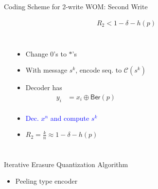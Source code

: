 \documentclass[10pt]{beamer}
\def\WOM_path{../compound-codes/WOM/slides/Figures}
\begin{document}
\begin{frame}{Coding Scheme for 2-write WOM: Second Write}
  \vspace{-2cm}
  \begin{center}
    \begin{align*}
      R_2 < 1 - \delta - h(p)
    \end{align*}
  \end{center}
  \vspace{-0.5cm}
  \begin{columns}
    \begin{center}
      \scalebox{0.5}{}
    \end{center}

    \begin{itemize}
    \item<1-> \alert{Change $0$'s to $*$'s}
    \item<1-> With message $s^k$, encode seq. to $\mathcal{C}(s^k)$
    \item<2-> Decoder has
      \small{
        \begin{align*}
          y_i&=x_i \oplus \mathsf{Ber}(p) \\
        \end{align*}
      }
    \vspace{-1.25cm}
    \item <3-> \textcolor{blue}{Dec. $x^n$ and compute $s^k$}
    \item <3-> $R_2=\tfrac{k}{n}\approx 1 - \delta - h(p)$
    \end{itemize}
  \end{columns}
\end{frame}

\begin{frame}{Iterative Erasure Quantization Algorithm}
  \begin{center}
    \scalebox{0.5}{}
  \end{center}
  \begin{itemize}
  \item \alert{Peeling type encoder}
  \begin{center}
  \end{center}

  \end{itemize}
\end{frame}
\end{document}
